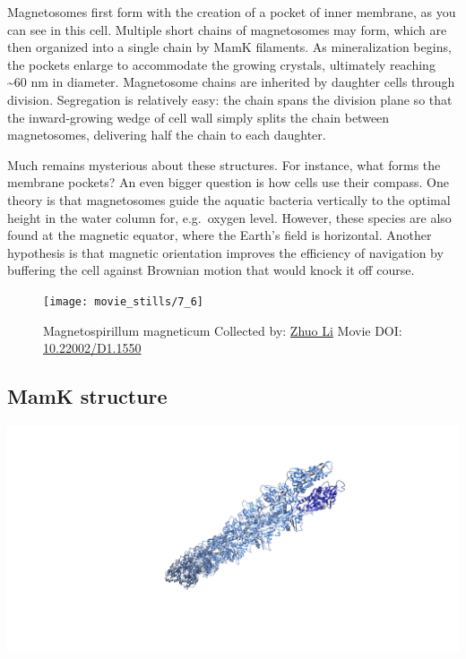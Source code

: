\documentclass[]{tufte-book}
\begin{document}
Magnetosomes first form with the creation of a pocket of inner membrane,
as you can see in this cell. Multiple short chains of magnetosomes may
form, which are then organized into a single chain by MamK filaments. As
mineralization begins, the pockets enlarge to accommodate the growing
crystals, ultimately reaching \textasciitilde{}60 nm in diameter.
Magnetosome chains are inherited by daughter cells through division.
Segregation is relatively easy: the chain spans the division plane so
that the inward-growing wedge of cell wall simply splits the chain
between magnetosomes, delivering half the chain to each daughter.

Much remains mysterious about these structures. For instance, what forms
the membrane pockets? An even bigger question is how cells use their
compass. One theory is that magnetosomes guide the aquatic bacteria
vertically to the optimal height in the water column for, e.g.~oxygen
level. However, these species are also found at the magnetic equator,
where the Earth's field is horizontal. Another hypothesis is that
magnetic orientation improves the efficiency of navigation by buffering
the cell against Brownian motion that would knock it off course.





\begin{figure}
\texttt{[image: movie\_stills/7\_6]} \caption[Magnetospirillum magneticum Collected by:
\protect\hyperlink{zhuo_li}{Zhuo Li} Movie DOI:
\href{https://doi.org/10.22002/D1.1550}{10.22002/D1.1550}]{Magnetospirillum magneticum Collected by:
\protect\hyperlink{zhuo_li}{Zhuo Li} Movie DOI:
\href{https://doi.org/10.22002/D1.1550}{10.22002/D1.1550}}\label{fig:7-6}
\end{figure}

\subsection{MamK structure}\label{MamK_structure}

\includegraphics{img/schematics/7_6_1}
\end{document}
